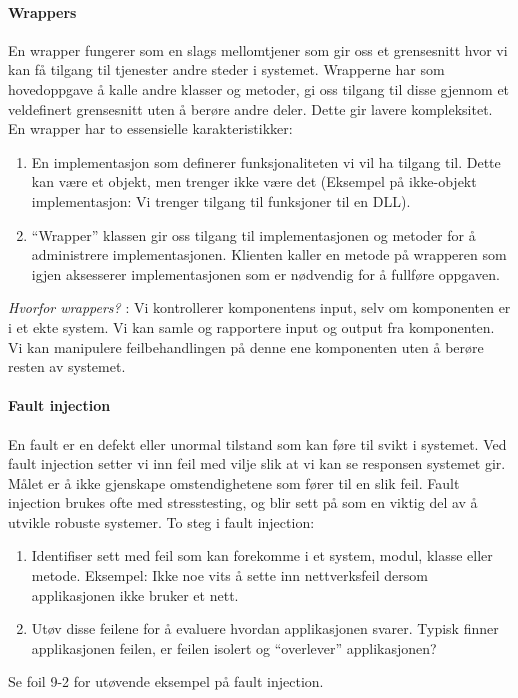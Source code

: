 \paragraph{Wrappers}

En wrapper fungerer som en slags mellomtjener som gir oss et grensesnitt
hvor vi kan få tilgang til tjenester andre steder i systemet. Wrapperne
har som hovedoppgave å kalle andre klasser og metoder, gi oss tilgang
til disse gjennom et veldefinert grensesnitt uten å berøre andre deler.
Dette gir lavere kompleksitet. En wrapper har to essensielle
karakteristikker:

\begin{enumerate}[1.]
\item
  En implementasjon som definerer funksjonaliteten vi vil ha tilgang
  til. Dette kan være et objekt, men trenger ikke være det (Eksempel på
  ikke-objekt implementasjon: Vi trenger tilgang til funksjoner til en
  DLL).
\item
  ``Wrapper'' klassen gir oss tilgang til implementasjonen og metoder
  for å administrere implementasjonen. Klienten kaller en metode på
  wrapperen som igjen aksesserer implementasjonen som er nødvendig for å
  fullføre oppgaven.
\end{enumerate}
\emph{Hvorfor wrappers?} : Vi kontrollerer komponentens input, selv om
komponenten er i et ekte system. Vi kan samle og rapportere input og
output fra komponenten. Vi kan manipulere feilbehandlingen på denne ene
komponenten uten å berøre resten av systemet.

\paragraph{Fault injection}

En fault er en defekt eller unormal tilstand som kan føre til svikt i
systemet. Ved fault injection setter vi inn feil med vilje slik at vi
kan se responsen systemet gir. Målet er å ikke gjenskape omstendighetene
som fører til en slik feil. Fault injection brukes ofte med
stresstesting, og blir sett på som en viktig del av å utvikle robuste
systemer. To steg i fault injection:

\begin{enumerate}[1.]
\item
  Identifiser sett med feil som kan forekomme i et system, modul, klasse
  eller metode. Eksempel: Ikke noe vits å sette inn nettverksfeil dersom
  applikasjonen ikke bruker et nett.
\item
  Utøv disse feilene for å evaluere hvordan applikasjonen svarer. Typisk
  finner applikasjonen feilen, er feilen isolert og ``overlever''
  applikasjonen?
\end{enumerate}
Se foil 9-2 for utøvende eksempel på fault injection.

